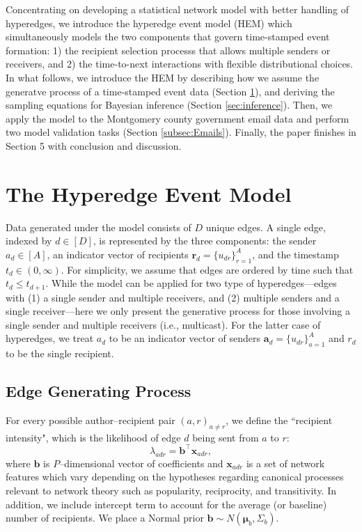 \documentclass[ba]{imsart}
\numberwithin{equation}{section}
\theoremstyle{plain}
\begin{document}
Concentrating on developing a statistical network model with better handling of hyperedges, we introduce the hyperedge event model (HEM) which simultaneously models the two components that govern time-stamped event formation: 1) the recipient selection processs that allows multiple senders or receivers, and 2) the time-to-next interactions with flexible distributional choices. In what follows, we introduce the HEM by describing how we assume the generatve process of a time-stamped event data (Section \ref{sec:generative process}), and deriving the sampling equations for Bayesian inference (Section \ref{sec:inference}). Then, we apply the model to the Montgomery county government email data and perform two model validation tasks (Section \ref{subsec:Emails}). Finally, the paper finishes in Section 5 with conclusion and discussion.
\section{The Hyperedge Event Model}\label{sec:generative process}

Data generated under the model consists of $D$ unique edges. A single edge, indexed by $d \in [D]$, is represented by the three components: the sender $a_d \in [A]$, an indicator vector of recipients $\boldsymbol{r}_d = \{u_{dr} \}_{r=1}^{A}$, and the timestamp $t_d \in (0, \infty)$. For simplicity, we assume that edges are ordered by time such that $t_d \leq t_{d+1}$. While the model can be applied for two type of hyperedges---edges with (1) a single sender and multiple receivers, and (2) multiple senders and a single receiver---here we only present the generative process for those involving a single sender and multiple receivers (i.e., multicast). For the latter case of hyperedges, we treat $a_d$ to be an indicator vector of senders $\boldsymbol{a}_d = \{u_{dr} \}_{a=1}^{A}$ and $r_d$ to be the single recipient.

\subsection{Edge Generating Process}\label{subsec: Tie}
For every possible author--recipient pair $(a,r)_{a \neq r}$, we define the ``recipient intensity", which is the likelihood of edge $d$ being sent from $a$ to $r$:
\begin{equation}
\lambda_{adr} = {\boldsymbol{b}}^{\top}\boldsymbol{x}_{adr},
\end{equation}
where $\boldsymbol{b}$ is $P$--dimensional vector of coefficients and $\boldsymbol{x}_{adr}$ is a set of network features which vary depending on the hypotheses regarding canonical processes relevant to network theory such as popularity, reciprocity, and transitivity. In addition, we include intercept term to account for the average (or baseline) number of recipients. We place a Normal prior $\boldsymbol{b} \sim N(\boldsymbol{\mu}_b, \Sigma_b)$.
\end{document}
